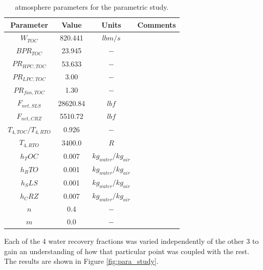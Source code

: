 \documentclass[12pt]{new-aiaa}
\begin{document}
\begin{table}[H]
    \centering
    \caption{atmosphere parameters for the parametric study.}
    \begin{tabular}{|c|c|c|c|}
        \hline
        Parameter             & Value    & Units                 & Comments \\
        \hline
        $W_{TOC}$             & 820.441  & $lbm/s$               &          \\
        $BPR_{TOC}$           & 23.945   & $-$                   &          \\
        $PR_{HPC,TOC}$        & 53.633   & $-$                   &          \\
        $PR_{LPC,TOC}$        & 3.00     & $-$                   &          \\
        $PR_{fan,TOC}$        & 1.30     & $-$                   &          \\
        $F_{net,SLS}$         & 28620.84 & $lbf$                 &          \\
        $F_{net,CRZ}$         & 5510.72  & $lbf$                 &          \\
        $T_{4,TOC}/T_{4,RTO}$ & 0.926    & $-$                   &          \\
        $T_{4,RTO}$           & 3400.0   & $R$                   &          \\
        $h_TOC$               & 0.007    & $kg_{water}/kg_{air}$ &          \\
        $h_RTO$               & 0.001    & $kg_{water}/kg_{air}$ &          \\
        $h_SLS$               & 0.001    & $kg_{water}/kg_{air}$ &          \\
        $h_CRZ$               & 0.007    & $kg_{water}/kg_{air}$ &          \\
        $n$                   & 0.4      & $-$                   &          \\
        $m$                   & 0.0      & $-$                   &          \\
        \hline
    \end{tabular}
    \label{hx_params}
\end{table}

\noindent
Each of the 4 water recovery fractions was varied independently of the other 3 to gain an understanding of how that particular point was coupled with the rest.
The results are shown in Figure \ref{fig:para_study}.
\end{document}
